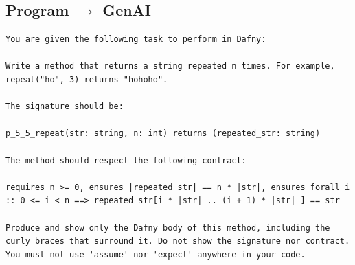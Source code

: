 \documentclass{article}
\begin{document}
\subsection*{Program $\rightarrow$ GenAI}
\begin{lstlisting}
You are given the following task to perform in Dafny:

Write a method that returns a string repeated n times. For example, repeat("ho", 3) returns "hohoho".

The signature should be:

p_5_5_repeat(str: string, n: int) returns (repeated_str: string)

The method should respect the following contract:

requires n >= 0, ensures |repeated_str| == n * |str|, ensures forall i :: 0 <= i < n ==> repeated_str[i * |str| .. (i + 1) * |str| ] == str

Produce and show only the Dafny body of this method, including the curly braces that surround it. Do not show the signature nor contract. You must not use 'assume' nor 'expect' anywhere in your code.
\end{lstlisting}
\end{document}

